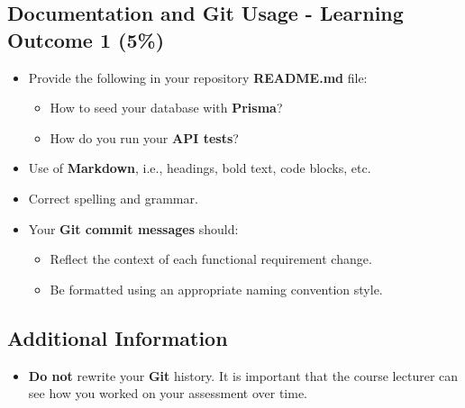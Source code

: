 \documentclass{article}
\begin{document}
\subsection*{Documentation and Git Usage - Learning Outcome 1 (5\%)}
\begin{itemize}
    \item Provide the following in your repository \textbf{README.md} file:
    \begin{itemize} 
      \item How to seed your database with \textbf{Prisma}?
      \item How do you run your \textbf{API tests}?
    \end{itemize}
    \item Use of \textbf{Markdown}, i.e., headings, bold text, code blocks, etc.
    \item Correct spelling and grammar.
    \item Your \textbf{Git commit messages} should:
    \begin{itemize}
      \item Reflect the context of each functional requirement change.
      \item Be formatted using an appropriate naming convention style.
    \end{itemize}	
\end{itemize}
          
\subsection*{Additional Information}
\begin{itemize}
    \item \textbf{Do not} rewrite your \textbf{Git} history. It is important that the course lecturer can see how you worked on your assessment over time. 
\end{itemize} 
\end{document}

